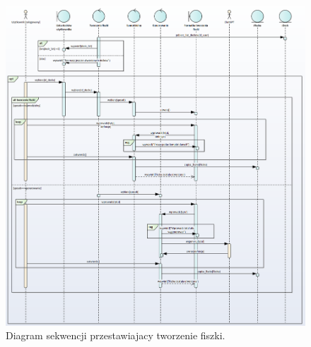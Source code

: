     \begin{figure}[H]
    \centering
    \includegraphics[width=1\textwidth]{chapters/chapter_6/diagram_sekwencji_2}
    \caption{Diagram sekwencji przestawiajacy tworzenie fiszki.}
    \label{img:diagram_sekwencji_2}
\end{figure}




    


